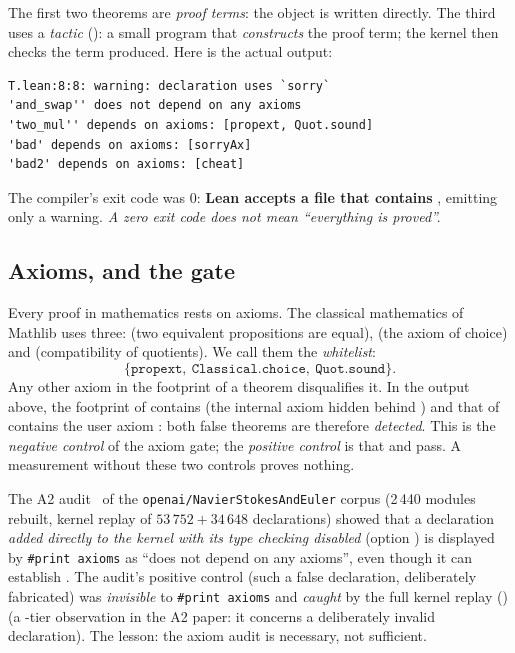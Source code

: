 The first two theorems are \emph{proof terms}: the object is written directly. The third uses a \emph{tactic} ():
a small program that \emph{constructs} the proof term; the kernel then checks the term produced. Here is the actual output:

\begin{lstlisting}[language={}]
T.lean:8:8: warning: declaration uses `sorry`
'and_swap'' does not depend on any axioms
'two_mul'' depends on axioms: [propext, Quot.sound]
'bad' depends on axioms: [sorryAx]
'bad2' depends on axioms: [cheat]
\end{lstlisting}

The compiler's exit code was $0$: \textbf{Lean accepts a file that contains }, emitting only a warning.
\emph{A zero exit code does not mean ``everything is proved''.}

\subsection{Axioms, and the gate}

Every proof in mathematics rests on axioms. The classical mathematics of Mathlib uses three:  (two equivalent
propositions are equal),  (the axiom of choice) and  (compatibility of quotients). We call them the \emph{whitelist}:
\[
  \{\texttt{propext},\ \texttt{Classical.choice},\ \texttt{Quot.sound}\}.
\]
Any other axiom in the footprint of a theorem disqualifies it. In the output above, the footprint of  contains  (the internal axiom
hidden behind ) and that of  contains the user axiom : both false theorems are therefore \emph{detected}.
This is the \emph{negative control} of the axiom gate; the \emph{positive control} is that  and  pass. A measurement without these two controls proves nothing.

\begin{warnbox}
The A2 audit~\cite{a2} of the \texttt{openai/NavierStokesAndEuler} corpus (2\,440 modules rebuilt, kernel replay of $53\,752+34\,648$ declarations) showed that a declaration
\emph{added directly to the kernel with its type checking disabled} (option ) is displayed by \texttt{\#print axioms} as
``does not depend on any axioms'', even though it can establish . The audit's positive control (such a false declaration, deliberately fabricated) was
\emph{invisible} to \texttt{\#print axioms} and \emph{caught} by the full kernel replay () (a \tierX{}-tier observation in the A2 paper: it concerns a deliberately invalid declaration). The lesson: the axiom audit is necessary,
not sufficient.
\end{warnbox}


